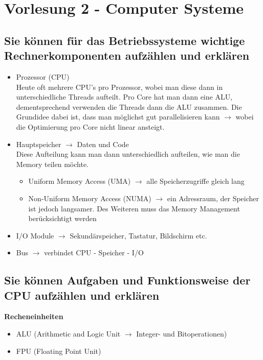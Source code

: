 \documentclass{report}
\theoremstyle{definition}
\theoremstyle{example}
\begin{document}
\chapter{Vorlesung 2 - Computer Systeme}

\section{Sie können für das Betriebssysteme wichtige Rechnerkomponenten aufzählen und erklären}
	\begin{itemize}
		\item {Prozessor (CPU)\\
		Heute oft mehrere CPU's pro Prozessor, wobei man diese dann in unterschiedliche Threads aufteilt. Pro Core hat man dann eine ALU, dementsprechend verwenden die Threads dann die ALU zusammen. Die Grundidee dabei ist, dass man möglichst gut parallelisieren kann $\rightarrow$ wobei die Optimierung pro Core nicht linear ansteigt.}
		\item {Hauptspeicher $\rightarrow$ Daten und Code\\
		Diese Aufteilung kann man dann unterschiedlich aufteilen, wie man die Memory teilen möchte.
\begin{itemize}
	\item Uniform Memory Access (UMA) $\rightarrow$ alle Speicherzugriffe gleich lang
	\item Non-Uniform Memory Access (NUMA) $\rightarrow$ ein Adressraum, der Speicher ist jedoch langsamer. Des Weiteren muss das Memory Management berücksichtigt werden
\end{itemize}}		
		\item I/O Module $\rightarrow$ Sekundärspeicher, Tastatur, Bildschirm etc.
		\item Bus $\rightarrow$ verbindet CPU - Speicher - I/O
	\end{itemize}

\section{Sie können Aufgaben und Funktionsweise der CPU aufzählen und erklären}
\textbf{Recheneinheiten}\\
\begin{itemize}
\item ALU (Arithmetic and Logic Unit $\rightarrow$ Integer- und Bitoperationen)
\item FPU (Floating Point Unit)
\end{itemize}
\end{document}
